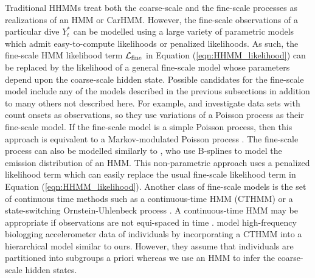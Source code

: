Traditional HHMMs treat both the coarse-scale and the fine-scale processes as realizations of an HMM or CarHMM. 
However, the fine-scale observations of a particular dive $Y^*_t$ can be modelled using a large variety of parametric models which admit easy-to-compute likelihoods or penalized likelihoods. As such, the fine-scale HMM likelihood term $\mathcal{L}_{\text{fine}}$ in Equation (\ref{eqn:HHMM_likelihood}) can be replaced by the likelihood of a general fine-scale model whose parameters depend upon the coarse-scale hidden state.
%
Possible candidates for the fine-scale model include any of the models described in the previous subsections in addition to many others not described here. 
For example, \citet{Bebbington:2007} and \citet{Borchers:2013} investigate data sets with count onsets as observations, so they use variations of a Poisson process as their fine-scale model. If the fine-scale model is a simple Poisson process, then this approach is equivalent to a Markov-modulated Poisson process \citep{Fischer:1993}.
The fine-scale process can also be modelled similarly to \citet{Langrock:2018}, who use B-splines to model the emission distribution of an HMM. This non-parametric approach uses a penalized likelihood term which can easily replace the usual fine-scale likelihood term in Equation (\ref{eqn:HHMM_likelihood}). 
Another class of fine-scale models is the set of continuous time methods such as a continuous-time HMM (CTHMM) \citep{Liu:2015} or a state-switching Ornstein-Uhlenbeck process \citep{Michelot:2019}. 
A continuous-time HMM may be appropriate if observations are not equi-spaced in time \citep{Liu:2015}. \citet{Xu:2018} model high-frequency biologging accelerometer data of individuals by incorporating a CTHMM into a hierarchical model similar to ours. However, they assume that individuals are partitioned into subgroups a priori whereas we use an HMM to infer the coarse-scale hidden states.

